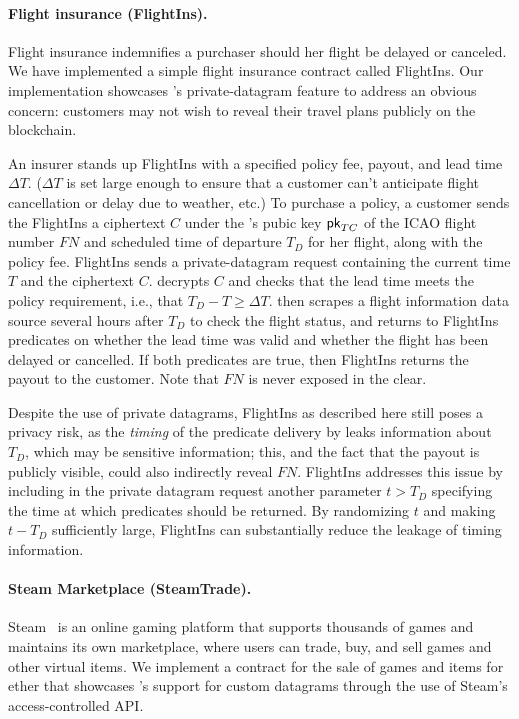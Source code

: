 \paragraph{Flight insurance ({\sf FlightIns}).}
Flight insurance indemnifies a purchaser should her flight be delayed or canceled.
We have implemented a simple flight insurance contract called {\sf FlightIns}.
Our implementation showcases \tc's private-datagram feature to address an obvious concern:
customers may not wish to reveal their travel plans publicly on the blockchain. 

An insurer stands up {\sf FlightIns} with a specified policy fee, payout, and lead time $\Delta T$. ($\Delta T$ is set large enough to ensure that a customer can't anticipate flight cancellation or delay due to weather, etc.) To purchase a policy, a customer sends the {\sf FlightIns} a ciphertext  $C$ under the \tc's pubic key ${\sf pk}_{TC}$ of the ICAO flight number $FN$ and scheduled time of departure $T_D$ for her flight, along with the policy fee. {\sf FlightIns} sends \tc a private-datagram request containing the current time $T$ and the ciphertext $C$. \tc decrypts $C$ and checks that the lead time meets the policy requirement, i.e., that $T_D - T \geq \Delta T$. \tc then scrapes a flight information data source several hours after $T_D$ to check the flight status, and returns to {\sf FlightIns} predicates on whether the lead time was valid and whether the flight has been delayed or cancelled. If both predicates are true, then {\sf FlightIns} returns the payout to the customer. Note that $FN$ is never exposed in the clear.

Despite the use of private datagrams, {\sf FlightIns} as described here still poses a privacy risk, as the {\em timing} of the predicate delivery by \tc leaks information about $T_D$, which may be sensitive information; this, and the fact that the payout is publicly visible, could also indirectly reveal $FN$. {\sf FlightIns} addresses this issue by including in the private datagram request another parameter $t > T_D$ specifying the time at which predicates should be returned. By randomizing $t$ and making $t - T_D$ sufficiently large, {\sf FlightIns} can substantially reduce the leakage of timing information. 

\paragraph{Steam Marketplace ({\sf SteamTrade}).} Steam~\cite{} is an online gaming platform that supports thousands of games and maintains its own marketplace, where users can trade, buy, and sell games and other virtual items.  We implement a contract for the sale of games and items for ether that showcases \tc's support for custom datagrams through the use of Steam's access-controlled API.

